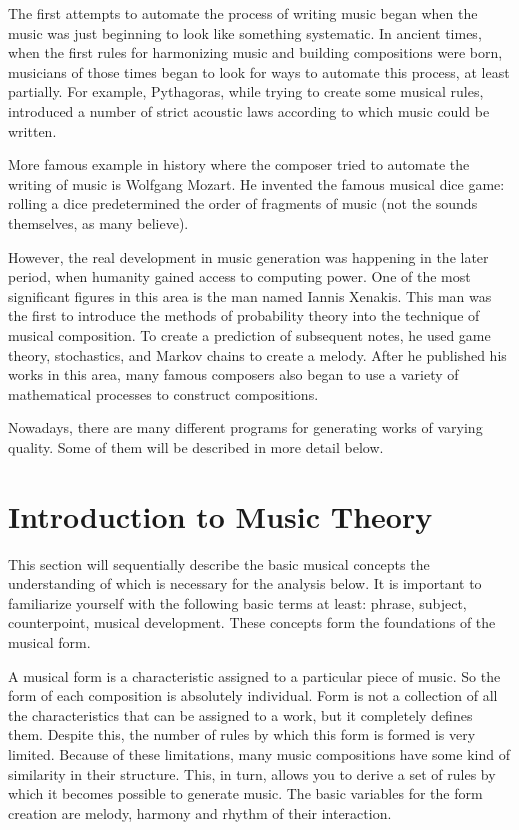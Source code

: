 \documentclass[thesis=B,english]{FITthesis}[2019/12/23]
\begin{document}
The first attempts to automate the process of writing music began when the music was just beginning to look like something systematic. In ancient times, when the first rules for harmonizing music and building compositions were born, musicians of those times began to look for ways to automate this process, at least partially. For example, Pythagoras, while trying to create some musical rules, introduced a number of strict acoustic laws according to which music could be written.

More famous example in history where the composer tried to automate the writing of music is Wolfgang Mozart. He invented the famous musical dice game: rolling a dice predetermined the order of fragments of music (not the sounds themselves, as many believe).


However, the real development in music generation was happening in the later period, when humanity gained access to computing power. One of the most significant figures in this area is the man named Iannis Xenakis. This man was the first to introduce the methods of probability theory into the technique of musical composition. To create a prediction of subsequent notes, he used game theory, stochastics, and Markov chains to create a melody. After he published his works in this area, many famous composers also began to use a variety of mathematical processes to construct compositions.

Nowadays, there are many different programs for generating works of varying quality. Some of them will be described in more detail below.

\section{Introduction to Music Theory}

This section will sequentially describe the basic musical concepts the understanding of which is necessary for the analysis below. It is important to familiarize yourself with the following basic terms at least: phrase, subject, counterpoint, musical development. These concepts form the foundations of the musical form.

 
A musical form is a characteristic assigned to a particular piece of music. So the form of each composition is absolutely individual. Form is not a collection of all the characteristics that can be assigned to a work, but it completely defines them. Despite this, the number of rules by which this form is formed is very limited. Because of these limitations, many music compositions have some kind of similarity in their structure. This, in turn, allows you to derive a set of rules by which it becomes possible to generate music. The basic variables for the form creation are melody, harmony and rhythm of their interaction.
\end{document}

